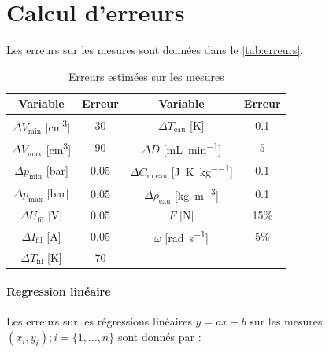 \section{Calcul d'erreurs}
\label{sec:erreurs}

Les erreurs sur les mesures sont données dans le \autoref{tab:erreurs}.

\begin{table}[h]
    \centering
    \begin{tabulary}{\textwidth}{C C C C}
        \toprule
        Variable & Erreur & Variable & Erreur \\
        \midrule
        \(\Delta V_\textrm{min}\) [\si{\centi\meter\cubed}] & 30 & \(\Delta T_\textrm{eau}\) [\si{\kelvin}] & 0.1 \\
        \(\Delta V_\textrm{max}\) [\si{\centi\meter\cubed}] & 90 & \(\Delta D\) [\si{\milli\liter \per \minute}] & 5 \\
        \(\Delta p_\textrm{min}\) [\si{\bar}] & 0.05 & \(\Delta C_\textrm{m,eau}\) [\si{\joule\per\kelvin\per\kilo\gram}] & 0.1 \\
        \(\Delta p_\textrm{max}\) [\si{\bar}] & 0.05 & \(\Delta \rho_\textrm{eau}\) [\si{\kilo\gram\per\meter\cubed}] & 0.1 \\
        \(\Delta U_\textrm{fil}\) [\si{\volt}] & 0.05 & \(F\) [\si{\newton}] & 15\% \\
        \(\Delta I_\textrm{fil}\) [\si{\ampere}] & 0.05 & \(\omega\) [\si{\radian \per \second}] & 5\% \\
        \(\Delta T_\textrm{fil}\) [\si{\kelvin}] & 70 & - & -\\
        \bottomrule
    \end{tabulary}
    \caption{Erreurs estimées sur les mesures}
    \label{tab:erreurs}
\end{table}

\paragraph*{Regression linéaire}
Les erreurs sur les régressions linéaires \(y = ax + b\) sur les mesures \((x_i, y_i) ; i = \{1, \hdots, n\}\) sont donnés par \cite{erreursmesure}:

